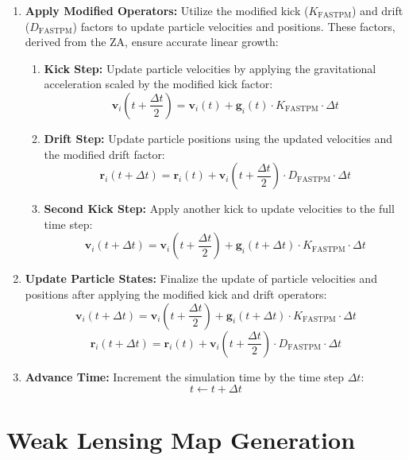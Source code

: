 \begin{enumerate}
    \item \textbf{Apply Modified Operators:}
    \label{fastpm:modified-kick-drift}
    Utilize the modified kick ($K_{\text{FASTPM}}$) and drift ($D_{\text{FASTPM}}$) factors to update particle velocities and positions. These factors, derived from the ZA, ensure accurate linear growth:
    
    \begin{enumerate}
        \item \textbf{Kick Step:}
        Update particle velocities by applying the gravitational acceleration scaled by the modified kick factor:
        \[
        \mathbf{v}_i\left(t + \frac{\Delta t}{2}\right) = \mathbf{v}_i(t) + \mathbf{g}_i(t) \cdot K_{\text{FASTPM}} \cdot \Delta t
        \]
        
        \item \textbf{Drift Step:}
        Update particle positions using the updated velocities and the modified drift factor:
        \[
        \mathbf{r}_i(t + \Delta t) = \mathbf{r}_i(t) + \mathbf{v}_i\left(t + \frac{\Delta t}{2}\right) \cdot D_{\text{FASTPM}} \cdot \Delta t
        \]
        
        \item \textbf{Second Kick Step:}
        Apply another kick to update velocities to the full time step:
        \[
        \mathbf{v}_i(t + \Delta t) = \mathbf{v}_i\left(t + \frac{\Delta t}{2}\right) + \mathbf{g}_i(t + \Delta t) \cdot K_{\text{FASTPM}} \cdot \Delta t
        \]
    \end{enumerate}
    
    \item \textbf{Update Particle States:}
    Finalize the update of particle velocities and positions after applying the modified kick and drift operators:
    \[
    \mathbf{v}_i(t + \Delta t) = \mathbf{v}_i\left(t + \frac{\Delta t}{2}\right) + \mathbf{g}_i(t + \Delta t) \cdot K_{\text{FASTPM}} \cdot \Delta t
    \]
    \[
    \mathbf{r}_i(t + \Delta t) = \mathbf{r}_i(t) + \mathbf{v}_i\left(t + \frac{\Delta t}{2}\right) \cdot D_{\text{FASTPM}} \cdot \Delta t
    \]
    
    \item \textbf{Advance Time:}
    Increment the simulation time by the time step $\Delta t$:
    \[
    t \leftarrow t + \Delta t
    \]
\end{enumerate}

\section{Weak Lensing Map Generation}
\label{sec:weak-lensing-generation}
